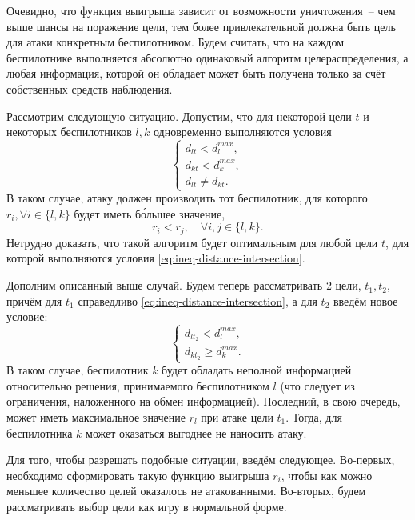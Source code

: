 Очевидно, что функция выигрыша зависит от возможности уничтожения~-- чем выше шансы на поражение цели, тем более привлекательной должна быть цель для атаки конкретным беспилотником.
Будем считать, что на каждом беспилотнике выполняется абсолютно одинаковый алгоритм целераспределения, а любая информация, которой он обладает может быть получена только за счёт собственных средств наблюдения.

Рассмотрим следующую ситуацию. 
Допустим, что для некоторой цели $ t $ и некоторых беспилотников $ l, k $ одновременно выполняются условия
\begin{equation} \label{eq:ineq-distance-intersection}
    \begin{cases}
        d_{lt} < d_{l}^{max}, \\
        d_{kt} < d_{k}^{max}, \\
        d_{lt} \ne d_{kt}.
    \end{cases}
\end{equation}
В таком случае, атаку должен производить тот беспилотник, для которого $ r_i, \forall i \in \{l, k\} $ будет иметь б\'{о}льшее значение,  
\begin{equation}
    r_i < r_j, \quad
        \forall i, j \in \{l, k\} .
\end{equation}
Нетрудно доказать, что такой алгоритм будет оптимальным для любой цели $ t $, для которой выполняются условия \eqref{eq:ineq-distance-intersection}.

Дополним описанный выше случай. 
Будем теперь рассматривать 2 цели, $ t_1, t_2 $, причём для $ t_1 $ справедливо \eqref{eq:ineq-distance-intersection}, а для $ t_2 $ введём новое условие:
\begin{equation}
    \begin{cases}
        d_{lt_2} < d_{l}^{max} , \\
        d_{kt_2} \ge d_{k}^{max} .
    \end{cases}
\end{equation}
В таком случае, беспилотник $ k $ будет обладать неполной информацией относительно решения, принимаемого беспилотником $ l $ (что следует из ограничения, наложенного на обмен информацией).
Последний, в свою очередь, может иметь максимальное значение $ r_l $ при атаке цели $ t_1 $.
Тогда, для беспилотника $ k $ может оказаться выгоднее не наносить атаку.

Для того, чтобы разрешать подобные ситуации, введём следующее. 
Во-первых, необходимо сформировать такую функцию выигрыша $ r_i $, чтобы как можно меньшее количество целей оказалось не атакованными.
Во-вторых, будем рассматривать выбор цели как игру в нормальной форме.

